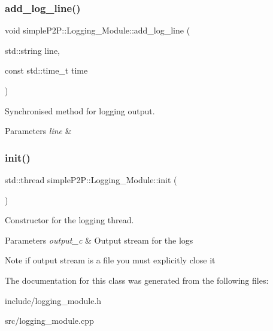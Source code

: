 \subsubsection{\texorpdfstring{add\+\_\+log\+\_\+line()}{add\_log\_line()}}
{\footnotesize\ttfamily void simple\+P2\+P\+::\+Logging\+\_\+\+Module\+::add\+\_\+log\+\_\+line (\begin{DoxyParamCaption}\item[{std\+::string}]{line,  }\item[{const std\+::time\+\_\+t}]{time }\end{DoxyParamCaption})}



Synchronised method for logging output. 


\begin{DoxyParams}{Parameters}
{\em line} & \\
\hline
\end{DoxyParams}
\mbox{\label{classsimpleP2P_1_1Logging__Module_a57e92e151320fd7c811689d831498b6a}} 
\subsubsection{\texorpdfstring{init()}{init()}}
{\footnotesize\ttfamily std\+::thread simple\+P2\+P\+::\+Logging\+\_\+\+Module\+::init (\begin{DoxyParamCaption}{ }\end{DoxyParamCaption})}



Constructor for the logging thread. 


\begin{DoxyParams}{Parameters}
{\em output\+\_\+c} & Output stream for the logs \\
\hline
\end{DoxyParams}
\begin{DoxyNote}{Note}
if output stream is a file you must explicitly close it 
\end{DoxyNote}


The documentation for this class was generated from the following files\+:\begin{DoxyCompactItemize}
\item 
include/logging\+\_\+module.\+h\item 
src/logging\+\_\+module.\+cpp\end{DoxyCompactItemize}
